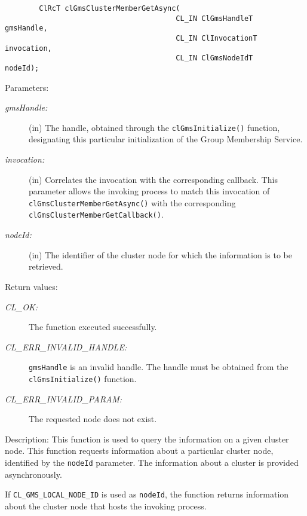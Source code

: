 \begin{flushleft}
\begin{Desc}
\footnotesize\begin{verbatim}        ClRcT clGmsClusterMemberGetAsync(
                                		CL_IN ClGmsHandleT              gmsHandle,
                                		CL_IN ClInvocationT             invocation,
                                		CL_IN ClGmsNodeIdT              nodeId);
\end{verbatim}
\normalsize
\end{Desc}
\begin{Desc}
\item[Parameters:]
\begin{description}
\item[{\em gms\-Handle:}](in) The handle, obtained through the {\tt{clGmsInitialize()}} function, designating this particular initialization of the 
Group Membership Service. 
\item[{\em invocation:}] (in) Correlates the invocation with the corresponding callback. This parameter allows the invoking process to
match this invocation of {\tt{clGmsClusterMemberGetAsync()}} with the corresponding
{\tt{cl\-Gms\-Cluster\-Member\-Get\-Callback()}}. 
\item[{\em node\-Id:}](in) The identifier of the cluster node for which the information is to be retrieved.\end{description}
\end{Desc}
\begin{Desc}
\item[Return values:]
\begin{description}
\item[{\em CL\_\-OK:}]The function executed successfully. \item[{\em CL\_\-ERR\_\-INVALID\_\-HANDLE:}]{\tt{gmsHandle}} is an invalid handle. The handle 
must be obtained from the {\tt{clGmsInitialize()}} function.
\item[{\em CL\_\-ERR\_\-INVALID\_\-PARAM:}]The requested node does not exist.\end{description}
\end{Desc}
\begin{Desc}
\item[Description:]This function is used to query the information on a given cluster node. This function requests information about
a particular cluster node, identified by the {\tt{node\-Id}} parameter. The information about a cluster is provided asynchronously.
\par
If {\tt{CL\_\-GMS\_\-LOCAL\_\-NODE\_\-ID}} is used as {\tt{node\-Id}},
the function returns information about the cluster node that hosts the invoking process. \par

\end{Desc}
\end{flushleft}
